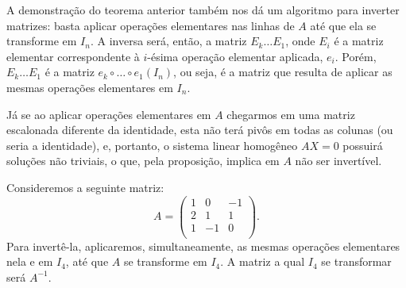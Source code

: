 A demonstração do teorema anterior também nos dá um algoritmo para inverter matrizes: basta aplicar operações elementares nas linhas de $A$ até que ela se transforme em $I_n$.
A inversa será, então, a matriz $E_k\dots E_1$, onde $E_i$ é a matriz elementar correspondente à $i$-ésima operação elementar aplicada, $e_i$.
Porém, $E_k\dots E_1$ é a matriz $e_k\circ \dots \circ e_1(I_n)$, ou seja, é a matriz que resulta de aplicar as mesmas operações elementares em $I_n$.

Já se ao aplicar operações elementares em $A$ chegarmos em uma matriz escalonada diferente da identidade, esta não terá pivôs em todas as colunas (ou seria a identidade), e, portanto, o sistema linear homogêneo $AX=0$ possuirá soluções não triviais, o que, pela proposição, implica em $A$ não ser invertível.

\begin{example}
    Consideremos a seguinte matriz:
    \begin{equation*}
        A = \begin{pmatrix}
            1 & 0 & -1 \\
            2 & 1 & 1 \\
            1 & -1 & 0 \\
        \end{pmatrix}.
    \end{equation*}
    Para invertê-la, aplicaremos, simultaneamente, as mesmas operações elementares nela e em $I_4$, até que $A$ se transforme em $I_4$. A matriz a qual $I_4$ se transformar será $A^{-1}$.


\end{example}
